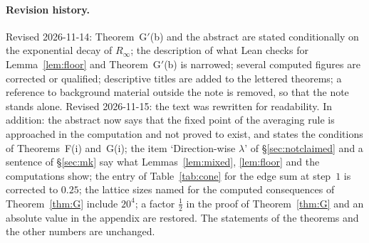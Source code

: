\documentclass[11pt,a4paper]{article}
\theoremstyle{definition}
\theoremstyle{remark}
\begin{document}
\paragraph{Revision history.} Revised 2026-11-14: Theorem~G$'$(b) and the abstract are stated conditionally on the exponential decay of $R_\infty$; the description of what Lean checks for Lemma~\ref{lem:floor} and Theorem~G$'$(b) is narrowed; several computed figures are corrected or qualified; descriptive titles are added to the lettered theorems; a reference to background material outside the note is removed, so that the note stands alone. Revised 2026-11-15: the text was rewritten for readability. In addition: the abstract now says that the fixed point of the averaging rule is approached in the computation and not proved to exist, and states the conditions of Theorems~F(i) and~G(i); the item `Direction-wise $\lambda$' of \S\ref{sec:notclaimed} and a sentence of \S\ref{sec:mk} say what Lemmas~\ref{lem:mixed}, \ref{lem:floor} and the computations show; the entry of Table~\ref{tab:cone} for the edge sum at step~$1$ is corrected to $0.25$; the lattice sizes named for the computed consequences of Theorem~\ref{thm:G} include $20^4$; a factor $\frac12$ in the proof of Theorem~\ref{thm:G} and an absolute value in the appendix are restored. The statements of the theorems and the other numbers are unchanged.
\end{document}
